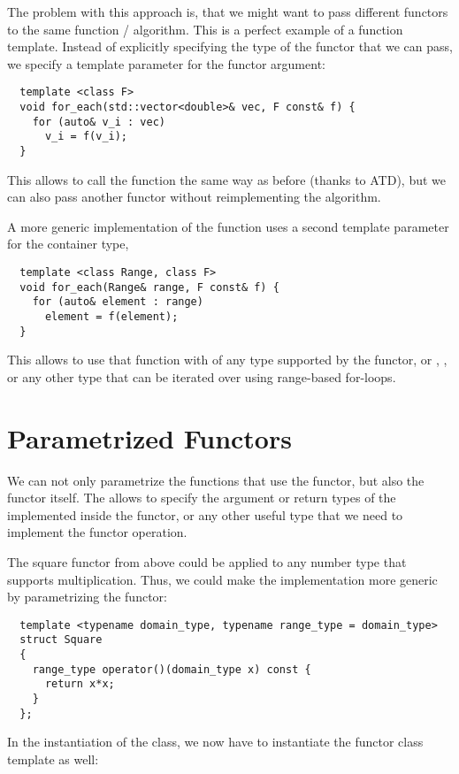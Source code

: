 The problem with this approach is, that we might want to pass different functors to the same function / algorithm. This is a perfect example
of a function template. Instead of explicitly specifying the type of the functor that we can pass, we specify a template parameter for the functor
argument:
\begin{verbatim}
  template <class F>
  void for_each(std::vector<double>& vec, F const& f) {
    for (auto& v_i : vec)
      v_i = f(v_i);
  }
\end{verbatim}

This allows to call the function  the same way as before (thanks to ATD), but we can also pass another functor without reimplementing the
algorithm.

\begin{rem}
  A more generic implementation of the  function uses a second template parameter for the container type, \ie
  \begin{verbatim}
  template <class Range, class F>
  void for_each(Range& range, F const& f) {
    for (auto& element : range)
      element = f(element);
  }
  \end{verbatim}
  This allows to use that function with  of any type supported by the functor, or , , or
  any other type that can be iterated over using range-based for-loops.
\end{rem}


\section{Parametrized Functors}
We can not only parametrize the functions that use the functor, but also the functor itself. The allows to specify the argument or return types
of the  implemented inside the functor, or any other useful type that we need to implement the functor operation.

\begin{example}
  The square functor from above could be applied to any number type that supports multiplication. Thus, we could make the implementation more
  generic by parametrizing the functor:

  \begin{verbatim}
  template <typename domain_type, typename range_type = domain_type>
  struct Square
  {
    range_type operator()(domain_type x) const {
      return x*x;
    }
  };
  \end{verbatim}

  In the instantiation of the class, we now have to instantiate the functor class template as well:
\end{example}

